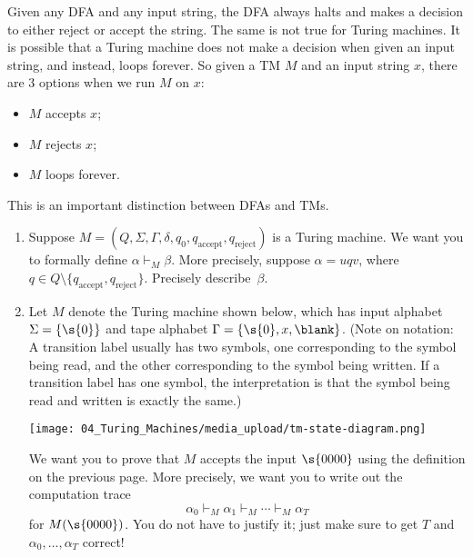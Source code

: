 \begin{important}
\label{important:Turing-machines-can-loop-forever}
Given any DFA and any input string, the DFA always halts and makes a decision to either reject or accept the string. The same is not true for Turing machines. It is possible that a Turing machine does not make a decision when given an input string, and instead, loops forever. So given a TM $M$ and an input string $x$, there are 3 options when we run $M$ on $x$: 
\begin{itemize}
    \item $M$ accepts $x$;
    \item $M$ rejects $x$;
    \item $M$ loops forever.
\end{itemize}
This is an important distinction between DFAs and TMs.

\end{important}

\begin{exercise}
\label{exercise:Practice-with-configurations} 
\begin{enumerate}
    \item Suppose $M = (Q,\Sigma, \Gamma, \delta, q_0, q_{\text{accept}}, q_{\text{reject}})$ is a Turing machine. We want you to formally define $\alpha \vdash_M \beta$. More precisely, suppose $\alpha = uqv$, where $q  \in Q \setminus \{q_{\text{accept}}, q_{\text{reject}}\}$. Precisely describe~$\beta$. 
    \item Let $M$ denote the Turing machine shown below, which has input alphabet $\Sigma = \{\s{0}\}$ and tape alphabet $\Gamma = \{\s{0},x, \blank\}$. (Note on notation: A transition label usually has two symbols, one corresponding to the symbol being read, and the other corresponding to the symbol being written. If a transition label has one symbol, the interpretation is that the symbol being read and written is exactly the same.)
    \begin{center}
        \texttt{[image: 04\_Turing\_Machines/media\_upload/tm-state-diagram.png]}   
    \end{center}
    We want you to prove that $M$ accepts the input $\s{0000}$ using the definition on the previous page.  More precisely, we want you to write out the  computation trace 
    \[
        \alpha_0 \vdash_M \alpha_1 \vdash_M \cdots \vdash_M \alpha_T
    \]
    for $M(\s{0000})$. You do not have to justify it; just make sure to get $T$ and $\alpha_0, \dots, \alpha_T$ correct!
\end{enumerate}

\end{exercise}

